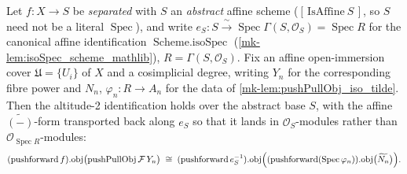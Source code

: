\begin{lemma}\label{mk-lem:pushPullObj_iso_tilde_affine}
  \leanok

  Let \(f : X \to S\) be \emph{separated} with \(S\) an \emph{abstract} affine scheme
  (\([\,\mathrm{IsAffine}\ S\,]\), so \(S\) need not be a literal \(\operatorname{Spec}\)), and
  write \(e_S : S \xrightarrow{\ \sim\ } \operatorname{Spec}\Gamma(S, \mathcal{O}_S) =
  \operatorname{Spec} R\) for the canonical affine identification \(\operatorname{Scheme.isoSpec}\)
  (\ref{mk-lem:isoSpec_scheme_mathlib}), \(R = \Gamma(S, \mathcal{O}_S)\). Fix an affine
  open-immersion cover \(\mathfrak{U} = \{U_i\}\) of \(X\) and a cosimplicial degree, writing
  \(Y_n\) for the corresponding fibre power and \(N_n\), \(\varphi_n : R \to A_n\) for the data of
  \ref{mk-lem:pushPullObj_iso_tilde}. Then the altitude-2 identification holds over the abstract
  base \(S\), with the affine \(\widetilde{(-)}\)-form transported back along \(e_S\) so that it
  lands in \(\mathcal{O}_S\)-modules rather than \(\mathcal{O}_{\operatorname{Spec} R}\)-modules:
  \[
    (\operatorname{pushforward} f).\!\operatorname{obj}\bigl(\operatorname{pushPullObj}
      \mathcal{F}\, Y_n\bigr)
    \;\cong\;
    (\operatorname{pushforward} e_S^{-1}).\!\operatorname{obj}\Bigl(
      (\operatorname{pushforward}(\operatorname{Spec}\varphi_n)).\!\operatorname{obj}\bigl(
        \widetilde{N_n}\bigr)\Bigr).
  \]
\end{lemma}
